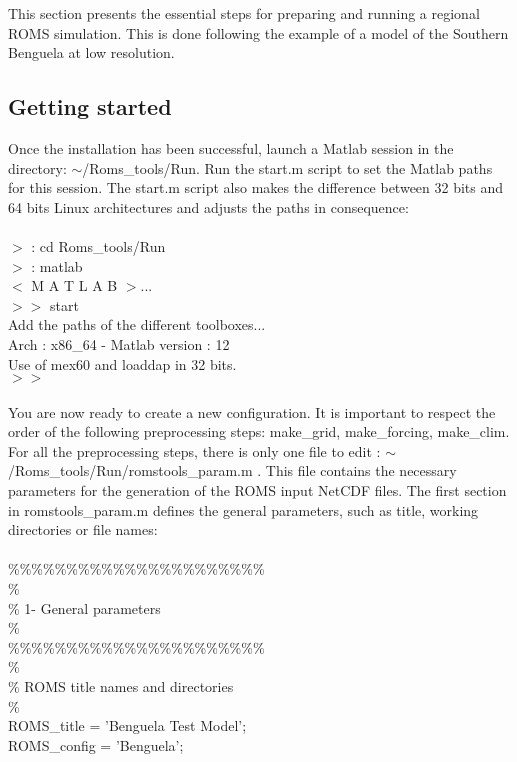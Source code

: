 This section presents the essential steps for preparing
and running a regional ROMS simulation. This is 
done following the example of a model of the
Southern Benguela at low resolution.
 
\subsection{Getting started}

Once the installation has been successful, launch a Matlab session
in the directory: $\sim$/Roms\_tools/Run. Run the start.m
script to set the Matlab paths for this session. The start.m script
also makes the difference between 32 bits and 64 bits Linux architectures
and adjusts the paths in consequence: \\
\\
$>$ : cd Roms\_tools/Run \\
$>$ : matlab \\
$<$ M A T L A B $>$...\\
$>>$ start \\
Add the paths of the different toolboxes... \\
Arch : x86\_64 - Matlab version : 12 \\
Use of mex60 and loaddap in 32 bits. \\
$>>$ \\
\\
You are now ready to create a new configuration.
It is important to respect the order of the following preprocessing 
steps: make\_grid, make\_forcing, make\_clim.
For all the preprocessing steps, there is only one file to edit : 
$\sim$/Roms\_tools/Run/romstools\_param.m .
This file contains the necessary parameters for the generation
of the ROMS input NetCDF files.
The first section in romstools\_param.m  defines the general parameters,
such as title, working directories or file names:
\\ \\
\%\%\%\%\%\%\%\%\%\%\%\%\%\%\%\%\%\%\%\%\%\%\\
\%\\
\% 1- General parameters\\
\%\\
\%\%\%\%\%\%\%\%\%\%\%\%\%\%\%\%\%\%\%\%\%\%\\
\%\\
\%  ROMS title names and directories\\
\%\\
ROMS\_title  = 'Benguela Test Model';\\
ROMS\_config = 'Benguela';\\
